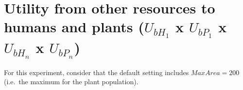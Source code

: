 \documentclass[
]{book}
\begin{document}
\newpage

\hypertarget{utility-from-other-resources-to-humans-and-plants-u_bh_1-x-u_bp_1-x-u_bh_n-x-u_bp_n}{%
\section{\texorpdfstring{Utility from other resources to humans and plants (\(U_{bH_{1}}\) x \(U_{bP_{1}}\) x \(U_{bH_{n}}\) x \(U_{bP_{n}}\))}{Utility from other resources to humans and plants (U\_\{bH\_\{1\}\} x U\_\{bP\_\{1\}\} x U\_\{bH\_\{n\}\} x U\_\{bP\_\{n\}\})}}\label{utility-from-other-resources-to-humans-and-plants-u_bh_1-x-u_bp_1-x-u_bh_n-x-u_bp_n}}


For this experiment, consider that the default setting includes \(MaxArea=200\) (i.e.~the maximum for the plant population).
\end{document}
